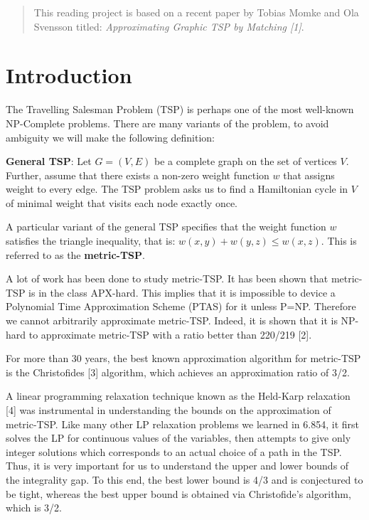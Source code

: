\documentclass[12pt]{article}
\begin{document}
\maketitle

\begin{abstract}
This reading project is based on a recent paper by Tobias Momke and Ola Svensson titled: \emph{Approximating Graphic TSP by Matching [1]}.
\end{abstract}


\section{Introduction}
The Travelling Salesman Problem (TSP) is perhaps one of the most well-known NP-Complete problems. There are many variants of the problem, to avoid ambiguity we will make the following definition:

{\bf General TSP}: Let $G = (V,E)$ be a complete graph on the set of vertices $V$. Further, assume that there exists a non-zero weight function $w$ that assigns weight to every edge. The TSP problem asks us to find a Hamiltonian cycle in $V$ of minimal weight that visits each node exactly once.

A particular variant of the general TSP specifies that the weight function $w$ satisfies the triangle inequality, that is: $w(x,y)+w(y,z) \leq w(x,z)$. This is referred to as the {\bf metric-TSP}.

A lot of work has been done to study metric-TSP. It has been shown that metric-TSP is in the class APX-hard. This implies that it is impossible to device a Polynomial Time Approximation Scheme (PTAS) for it unless P=NP. Therefore we cannot arbitrarily approximate metric-TSP. Indeed, it is shown that it is NP-hard to approximate metric-TSP with a ratio better than 220/219 [2].

For more than 30 years, the best known approximation algorithm for metric-TSP is the Christofides [3] algorithm, which achieves an approximation ratio of 3/2.

A linear programming relaxation technique known as the Held-Karp relaxation [4] was instrumental in understanding the bounds on the approximation of metric-TSP. Like many other LP relaxation problems we learned in 6.854, it first solves the LP for continuous values of the variables, then attempts to give only integer solutions which corresponds to an actual choice of a path in the TSP. Thus, it is very important for us to understand the upper and lower bounds of the integrality gap. To this end, the best lower bound is 4/3 and is conjectured to be tight, whereas the best upper bound is obtained via Christofide's algorithm, which is 3/2.
\end{document}
